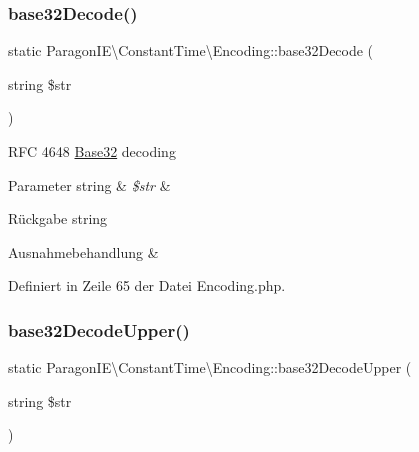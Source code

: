 \subsubsection{\texorpdfstring{base32\+Decode()}{base32Decode()}}
{\footnotesize\ttfamily static Paragon\+I\+E\textbackslash{}\+Constant\+Time\textbackslash{}\+Encoding\+::base32\+Decode (\begin{DoxyParamCaption}\item[{string}]{\$str }\end{DoxyParamCaption})\hspace{0.3cm}{\ttfamily [static]}}

R\+FC 4648 \mbox{\hyperlink{class_paragon_i_e_1_1_constant_time_1_1_base32}{Base32}} decoding


\begin{DoxyParams}[1]{Parameter}
string & {\em \$str} & \\
\hline
\end{DoxyParams}
\begin{DoxyReturn}{Rückgabe}
string 
\end{DoxyReturn}

\begin{DoxyExceptions}{Ausnahmebehandlung}
{\em } & \\
\hline
\end{DoxyExceptions}


Definiert in Zeile 65 der Datei Encoding.\+php.

\mbox{\label{class_paragon_i_e_1_1_constant_time_1_1_encoding_a49b7623f6e52f754db25d878ac21857d}} 
\subsubsection{\texorpdfstring{base32\+Decode\+Upper()}{base32DecodeUpper()}}
{\footnotesize\ttfamily static Paragon\+I\+E\textbackslash{}\+Constant\+Time\textbackslash{}\+Encoding\+::base32\+Decode\+Upper (\begin{DoxyParamCaption}\item[{string}]{\$str }\end{DoxyParamCaption})\hspace{0.3cm}{\ttfamily [static]}}

